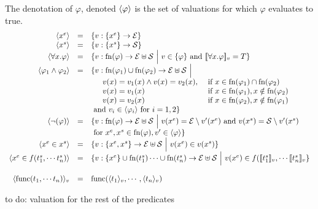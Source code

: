 The denotation of $\varphi$, denoted $\langle{\varphi}\rangle$ is the set of valuations for which $\varphi$ evaluates to true.
\[
\begin{array}{rcl}
  \langle{x^e}\rangle &=& \{v : \{x^e\}\to \mathcal{E}\}\\
  \langle{x^s}\rangle &=& \{v : \{x^s\}\to \mathcal{S}\}\\
  \langle{\forall x.\varphi}\rangle &=& \{v :\mathrm{fn}(\varphi)\to\mathcal{E}\uplus\mathcal{S} ~\Big|~ v \in \{\varphi\}\text{ and }[\![\forall x.\varphi]\!]_v= T\}\\
  \langle{\varphi_1 \wedge \varphi_2}\rangle &=& \{v: \mathrm{fn}(\varphi_1)\cup\mathrm{fn}(\varphi_2)\to\mathcal{E}\uplus\mathcal{S}~\Big|~ \\
  &&\begin{array}{ll}
  \quad v(x) = v_1(x)\wedge v(x) = v_2(x), &\text{ if }x\in\mathrm{fn}(\varphi_1)\cap\mathrm{fn}(\varphi_2)\\
  \quad v(x) = v_1(x) &\text{ if }x\in\mathrm{fn}(\varphi_1),x\notin\mathrm{fn}(\varphi_2)\\
  \quad v(x) = v_2(x) &\text{ if }x\in\mathrm{fn}(\varphi_2),x\notin\mathrm{fn}(\varphi_1)\\
  \end{array}\\
  &&\text{ and }v_i\in\langle{\varphi_i}\rangle\text{ for }i=1,2\}\\
  \langle{\neg(\varphi)}\rangle &=& \{v :\mathrm{fn}(\varphi)\to\mathcal{E}\uplus\mathcal{S} ~\Big|~ v(x^e) = \mathcal{E}\setminus v'(x^e)\text{ and }v(x^s) = \mathcal{S}\setminus v'(x^s)\\
  &&\text{ for }x^e, x^s\in \mathrm{fn}(\varphi), v'\in\langle{\varphi}\rangle\}
  \\
  \langle{ x^e\in x^s}\rangle &=& \{v :\{x^e,x^s\}\to\mathcal{E}\uplus\mathcal{S} ~\Big|~ v(x^e)\in v(x^s) \} \\
  \langle{ x^e\in f(t^s_1,\cdots t^s_n)}\rangle &=& \{v :\{x^e\}\cup\mathrm{fn}(t^s_1)\cdots\cup\mathrm{fn}(t^s_n)\to\mathcal{E}\uplus\mathcal{S} ~\Big|~ v(x^e)\in f([\![t^s_1]\!]_v,\cdots [\![t^s_n]\!]_v \} \\
  \\
  \langle{\text{func}(t_1,\cdots t_n)}\rangle_{v} &=& \text{func}(\langle{t_1}\rangle_{v},\cdots,\langle{t_n}\rangle_{v}) \\
\end{array}
\]
\begin{mdframed}[backgroundcolor=blue!20]
to do: valuation for the rest of the predicates
\end{mdframed}
